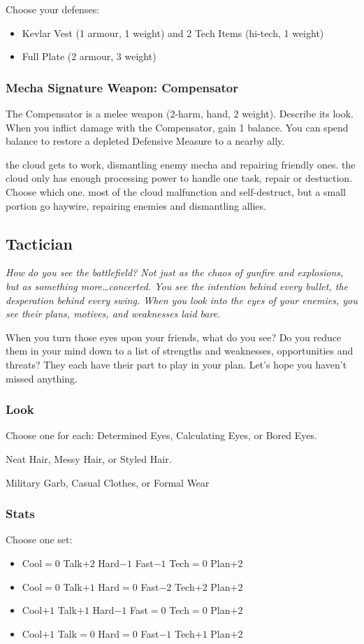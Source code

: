 Choose your defenses:
\begin{itemize}
\item Kevlar Vest (1 armour, 1 weight) and 2 Tech Items (hi-tech, 1 weight)
\item Full Plate (2 armour, 3 weight)
\end{itemize}

\subsubsection{Mecha Signature Weapon: Compensator}
The Compensator is a melee weapon (2-harm, hand, 2 weight). Describe its look.
When you inflict damage with the Compensator, gain 1 balance. You can spend balance to restore a depleted Defensive Measure to a nearby ally.

{the cloud gets to work, dismantling enemy mecha and repairing friendly ones.}
{the cloud only has enough processing power to handle one task, repair or destuction. Choose which one.}
{most of the cloud malfunction and self-destruct, but a small portion go haywire, repairing enemies and dismantling allies.}

\subsection{Tactician}
{\itshape How do you see the battlefield? Not just as the chaos of
  gunfire and explosions, but as something more\ldots concerted. You
  see the intention behind every bullet, the desperation behind every
  swing. When you look into the eyes of your enemies, you see their
  plans, motives, and weaknesses laid bare.

When you turn those eyes upon your friends, what do you see? Do you
reduce them in your mind down to a list of strengths and weaknesses,
opportunities and threats? They each have their part to play in your
plan. Let's hope you haven't missed anything.}
\subsubsection{Look}
Choose one for each:
Determined Eyes, Calculating Eyes, or Bored Eyes.

Neat Hair, Messy Hair, or Styled Hair.

Military Garb, Casual Clothes, or Formal Wear

\subsubsection{Stats}
Choose one set:
\begin{itemize}
\setlength\itemsep{0em}
\item Cool${=}0$ Talk$+2$ Hard$-1$ Fast$-1$ Tech${=}0$ Plan$+2$
\item Cool${=}0$ Talk$+1$ Hard${=}0$ Fast$-2$ Tech$+2$ Plan$+2$
\item Cool$+1$ Talk$+1$ Hard$-1$ Fast${=}0$ Tech${=}0$ Plan$+2$
\item Cool$+1$ Talk${=}0$ Hard${=}0$ Fast$-1$ Tech$+1$ Plan$+2$
\end{itemize}

